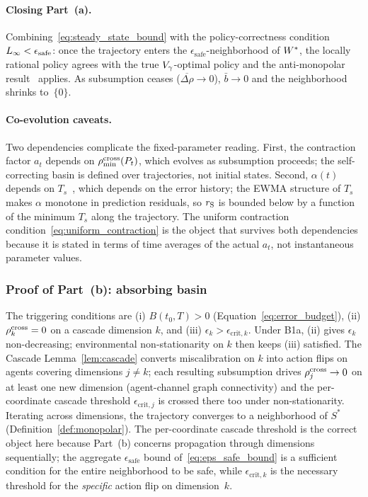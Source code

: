 \paragraph{Closing Part~(a).}
Combining~\eqref{eq:steady_state_bound} with the policy-correctness
condition $L_\infty < \epsilon_{\mathrm{safe}}$:  once the
trajectory enters the $\epsilon_{\mathrm{safe}}$-neighborhood of
$W^*$, the locally rational policy agrees with the true
$V_\gamma$-optimal policy and the anti-monopolar
result~\citep[Proposition~6]{lasser2026horizon} applies.  As
subsumption ceases ($\overline{\Delta\rho} \to 0$), $\bar{b} \to 0$
and the neighborhood shrinks to~$\{0\}$.

\paragraph{Co-evolution caveats.}
Two dependencies complicate the fixed-parameter reading.  First, the
contraction factor $a_t$ depends on $\rho_{\min}^{\mathrm{cross}}(P_t)$, which evolves
as subsumption proceeds; the self-correcting basin is defined over
trajectories, not initial states.  Second, $\alpha(t)$ depends on
$T_s$~\citep{lasser2026gfm}, which depends on the error history; the
EWMA structure of $T_s$ makes $\alpha$ monotone in prediction
residuals, so $r_{\mathrm{S}}$ is bounded below by a function of the minimum
$T_s$ along the trajectory.  The uniform contraction
condition~\eqref{eq:uniform_contraction} is the object that survives
both dependencies because it is stated in terms of time averages of
the actual $a_t$, not instantaneous parameter values.

\subsubsection*{Proof of Part~(b): absorbing basin}

The triggering conditions are (i) $B(t_0, T) > 0$
(Equation~\ref{eq:error_budget}), (ii) $\rho^{\mathrm{cross}}_k = 0$ on a cascade
dimension $k$, and (iii) $\epsilon_k > \epsilon_{\mathrm{crit},k}$.
Under B1a, (ii) gives $\epsilon_k$ non-decreasing; environmental
non-stationarity on $k$ then keeps (iii) satisfied.  The Cascade
Lemma~\ref{lem:cascade} converts miscalibration on $k$ into action
flips on agents covering dimensions $j \neq k$; each resulting
subsumption drives $\rho^{\mathrm{cross}}_j \to 0$ on at least one new dimension
(agent-channel graph connectivity) and the per-coordinate cascade
threshold $\epsilon_{\mathrm{crit},j}$ is crossed there too under
non-stationarity.  Iterating across dimensions, the trajectory
converges to a neighborhood of $S^*$
(Definition~\ref{def:monopolar}).  The per-coordinate cascade
threshold is the correct object here because Part~(b) concerns
propagation through dimensions sequentially; the aggregate
$\epsilon_{\mathrm{safe}}$ bound of~\eqref{eq:eps_safe_bound} is
a sufficient condition for the entire neighborhood to be safe, while
$\epsilon_{\mathrm{crit},k}$ is the necessary threshold for the
\emph{specific} action flip on dimension~$k$.

